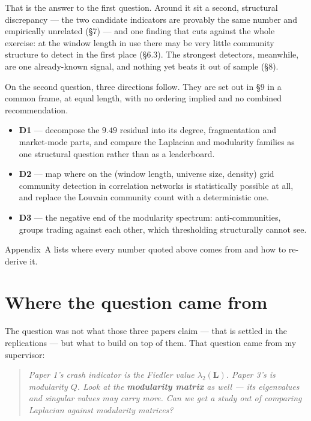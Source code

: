 \documentclass[11pt,a4paper]{article}
\newcommand{\Q}{Q}
\newcommand{\Lap}{\mathbf{L}}
\begin{document}
\noindent That is the answer to the first question. Around it sit a second,
structural discrepancy --- the two candidate indicators are provably the same
number and empirically unrelated (\S7) --- and one finding that cuts against the
whole exercise: at the window length in use there may be very little community
structure to detect in the first place (\S6.3). The strongest detectors, mean\-while,
are one already-known signal, and nothing yet beats it out of sample (\S8).

On the second question, three directions follow. They are set out in \S9 in a
common frame, at equal length, with no ordering implied and no combined
recommendation.

\begin{itemize}
\item \textbf{D1} --- decompose the $9.49$ residual into its degree, fragmentation
and market-mode parts, and compare the Laplacian and modularity families as one
structural question rather than as a leaderboard.
\item \textbf{D2} --- map where on the (window length, universe size, density)
grid community detection in correlation networks is statistically possible at
all, and replace the Louvain community count with a deterministic one.
\item \textbf{D3} --- the negative end of the modularity spectrum:
anti-communities, groups trading against each other, which thresholding
structurally cannot see.
\end{itemize}

\noindent Appendix~A lists where every number quoted above comes from and how to
re-derive it.

\section{Where the question came from}

The question was not what those three papers claim --- that is settled in the
replications --- but what to build on top of them. That question came from my
supervisor:

\begin{quote}\itshape
Paper 1's crash indicator is the Fiedler value $\lambda_2(\Lap)$. Paper 3's is
modularity $\Q$. Look at the \textbf{modularity matrix} as well --- its
eigenvalues and singular values may carry more. Can we get a study out of
comparing Laplacian against modularity matrices?
\end{quote}
\end{document}
